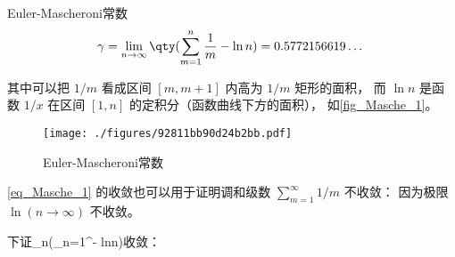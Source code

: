 

\begin{issues}
\issueDraft
\end{issues}


\begin{definition}{Euler-Mascheroni常数}
\begin{equation}\label{eq_Masche_1}
\gamma = \lim_{n\to\infty} \qty(\sum_{m=1}^n \frac{1}{m} - \ln n) = 0.5772156619\dots~
\end{equation}
\end{definition}


其中可以把 $1/m$ 看成区间 $[m, m+1]$ 内高为 $1/m$ 矩形的面积， 而 $\ln n$ 是函数 $1/x$ 在区间 $[1,n]$ 的定积分（函数曲线下方的面积）， 如\autoref{fig_Masche_1}。

\begin{figure}[ht]
\centering
\texttt{[image: ./figures/92811bb90d24b2bb.pdf]}
\caption{Euler-Mascheroni常数} \label{fig_Masche_1}
\end{figure}

\autoref{eq_Masche_1} 的收敛也可以用于证明调和级数 $\sum_{m=1}^\infty 1/m$ 不收敛： 因为极限 $\ln(n\to\infty)$ 不收敛。

下证\lim_{n\to\infty}(\sum_{n=1}^\n - lnn)收敛：
